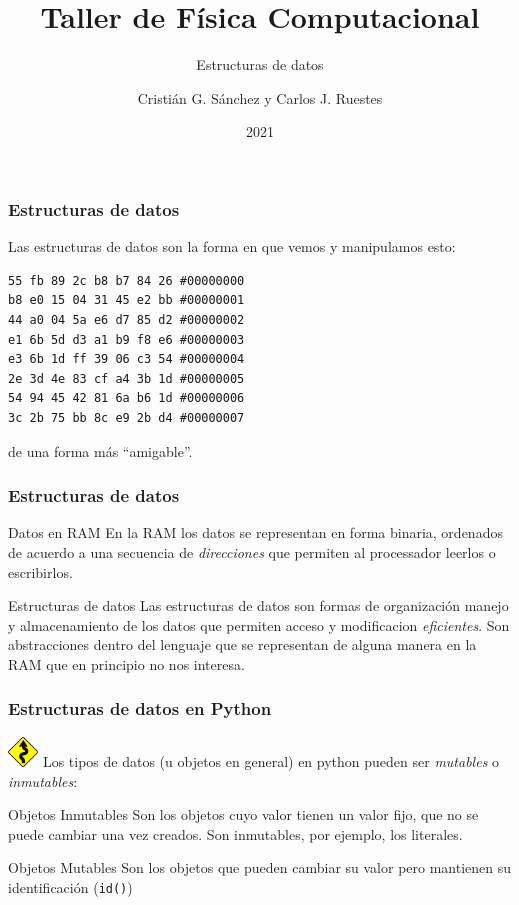 \documentclass{beamer}
\title{Taller de Física Computacional}
\subtitle{Estructuras de datos}
\author{Cristián G. Sánchez y Carlos J. Ruestes}
\date{2021}
\begin{document}
\frame{\titlepage}

\begin{frame}[fragile]
    \frametitle{Estructuras de datos}
    Las estructuras de datos son la forma en que vemos y manipulamos esto:
    \begin{verbatim}
55 fb 89 2c b8 b7 84 26 #00000000 
b8 e0 15 04 31 45 e2 bb #00000001
44 a0 04 5a e6 d7 85 d2 #00000002
e1 6b 5d d3 a1 b9 f8 e6 #00000003
e3 6b 1d ff 39 06 c3 54 #00000004
2e 3d 4e 83 cf a4 3b 1d #00000005
54 94 45 42 81 6a b6 1d #00000006
3c 2b 75 bb 8c e9 2b d4 #00000007
    \end{verbatim}    
    de una forma más ``amigable''.
\end{frame}

\begin{frame}[fragile]
    \frametitle{Estructuras de datos}
    \begin{block}{Datos en RAM}
        En la RAM los datos se representan en forma binaria, ordenados de acuerdo a una secuencia de {\em direcciones} que permiten al processador
        leerlos o escribirlos. 
    \end{block}
    \begin{block}{Estructuras de datos}
        Las estructuras de datos son formas de organización manejo y almacenamiento de los datos que permiten acceso y modificacion {\em eficientes}.
        Son abstracciones dentro del lenguaje que se representan de alguna manera en la RAM que \alert{en principio} no nos interesa.
    \end{block}
\end{frame}


\begin{frame}
    \frametitle{Estructuras de datos en Python}
    \includegraphics[height=0.8cm, width=0.8cm]{figuras/sin.png}
        Los tipos de datos (u objetos en general) en python pueden ser {\em mutables} o {\em inmutables}:
        \begin{block}{Objetos Inmutables}
            Son los objetos cuyo valor tienen un valor fijo, que no se puede cambiar una vez creados. Son inmutables, por ejemplo, los literales.
        \end{block}
        \begin{block}{Objetos Mutables}
            Son los objetos que pueden cambiar su valor pero mantienen su identificación (\texttt{id()})
        \end {block}        
\end{frame}
\end{document}
